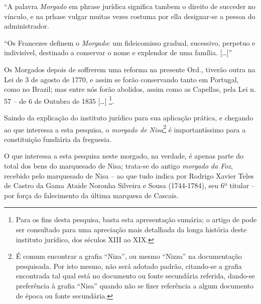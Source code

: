 \begin{citacao}
``A palavra \textit{Morgado} em phrase jurídica significa tambem o direito de succeder no vínculo, e na prhase vulgar muitas vezes costuma por ella designar-se a pessoa do administrador.

``Os Francezes definem o \textit{Morgado}: um fideicomisso gradual, sucessivo, perpetuo e indivisível, destinado a conservar o nome e explendor de uma família. [\dots]''

Os Morgados depois de soffrerem uma reforma na presente Ord., tiverão outra na Lei de 3 de agosto de 1770, e assim se forão conservando tanto em Portugal, como no Brazil; mas entre nós forão abolidos, assim como as Capellas, pela Lei n. 57 -- de 6 de Outubro de 1835 [\dots] \cite[p.~990]{ordfil_1870}\footnote{Para os fins desta pesquisa, basta esta apresentação sumária; o artigo de  pode ser consultado para uma apreciação mais detalhada da longa história deste instituto jurídico, dos séculos XIII ao XIX.}. 
\end{citacao}

Saindo da explicação do instituto jurídico para sua aplicação prática, e chegando ao que interessa a esta pesquisa, o \textit{morgado de Nisa}\footnote{É comum encontrar a grafia ``Niza'', ou mesmo ``Nizza'' na documentação pesquisada. Por isto mesmo, não será adotado padrão, citando-se a grafia encontrada tal qual está no documento ou fonte secundária referida, dando-se preferência à grafia ``Nisa'' quando não se fizer referência a algum documento de época ou fonte secundária.} é importantíssimo para a constituição fundiária da freguesia. 

O que interessa a esta pesquisa neste morgado, na verdade, é apenas parte do total dos bens do marquesado de Nisa; trata-se do antigo \textit{morgado da Foz}, recebido pelo marquesado de Nisa -- ao que tudo indica por Rodrigo Xavier Teles de Castro da Gama Ataide Noronha Silveira e Sousa (1744-1784), seu 6º titular \cite{wiki_nisa_2015} -- por força do falecimento da última marquesa de Cascais. 

